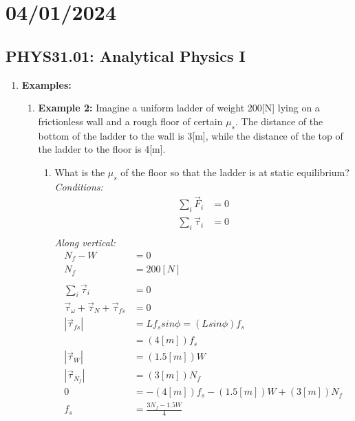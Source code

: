 \documentclass{article}
\begin{document}
\section*{04/01/2024}
\subsection*{PHYS31.01: Analytical Physics I}
        \begin{enumerate}
            \item \textbf{Examples:}
            \begin{enumerate}
                \item \textbf{Example 2:}
                Imagine a uniform ladder of weight 200[N] lying on a frictionless wall and a rough floor of certain $\mu_s$. The distance of the bottom of the ladder to the wall is 3[m], while the distance of the top of the ladder to the floor is 4[m].
                \begin{enumerate}
                    \item What is the $\mu_s$ of the floor so that the ladder is at static equilibrium? 
                    \textit{Conditions: }
                    \begin{align*}
                        \sum_i\vec{F}_i&=0 \\
                        \sum_i\vec{\tau}_i&=0 \\
                    \end{align*}
                        \textit{Along vertical: }
                    \begin{align*}
                        N_f-W&=0 \\
                        N_f&=200[N] \\
                        \\
                        \sum_i\vec{\tau}_i&=0 \\
                        \vec{\tau}_{\omega}+\vec{\tau}_{N}+\vec{\tau}_{fs}&=0 \\
                        |\vec{\tau}_{fs}|&=Lf_ssin\phi=(Lsin\phi)f_s \\
                        &=(4[m])f_s \\
                        |\vec{\tau}_{W}|&=(1.5[m])W \\
                        |\vec{\tau}_{N_f}|&=(3[m])N_f \\
                        0&=-(4[m])f_s-(1.5[m])W+(3[m])N_f \\
                        f_s&=\frac{3N_f-1.5W}{4} \\

\end{align*}
\end{enumerate}
\end{enumerate}
\end{enumerate}
\end{document}
